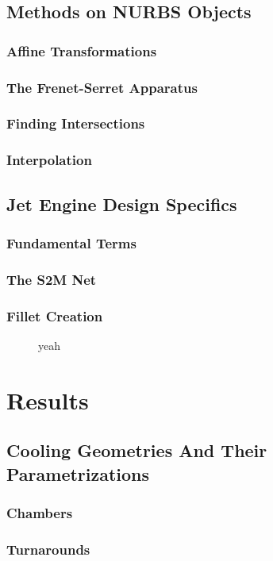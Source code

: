 \documentclass[a4paper, 11pt]{report}
\theoremstyle{definition}
\begin{document}
\section{Methods on NURBS Objects}
\subsection{Affine Transformations}
\subsection{The Frenet-Serret Apparatus}
\subsection{Finding Intersections}
\subsection{Interpolation}

\section{Jet Engine Design Specifics}
\subsection{Fundamental Terms}
\subsection{The S2M Net}
\subsection{Fillet Creation}
\begin{figure}[!ht]
	\centering
	
	\caption{yeah}
\end{figure}

\chapter{Results}
\section{Cooling Geometries And Their Parametrizations}
\subsection{Chambers}
\subsection{Turnarounds}
\end{document}
